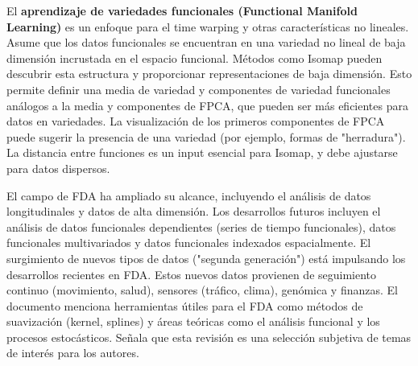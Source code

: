 \documentclass{article}
\begin{document}
\vspace{0.35cm}\noindent
El \textbf{aprendizaje de variedades funcionales (Functional Manifold Learning)} es un enfoque para el time warping y otras características no lineales. Asume que los datos funcionales se encuentran en una variedad no lineal de baja dimensión incrustada en el espacio funcional. Métodos como Isomap pueden descubrir esta estructura y proporcionar representaciones de baja dimensión. Esto permite definir una media de variedad y componentes de variedad funcionales análogos a la media y componentes de FPCA, que pueden ser más eficientes para datos en variedades. La visualización de los primeros componentes de FPCA puede sugerir la presencia de una variedad (por ejemplo, formas de "herradura"). La distancia entre funciones es un input esencial para Isomap, y debe ajustarse para datos dispersos.

\vspace{0.35cm}\noindent
El campo de FDA ha ampliado su alcance, incluyendo el análisis de datos longitudinales y datos de alta dimensión. Los desarrollos futuros incluyen el análisis de datos funcionales dependientes (series de tiempo funcionales), datos funcionales multivariados y datos funcionales indexados espacialmente. El surgimiento de nuevos tipos de datos ("segunda generación") está impulsando los desarrollos recientes en FDA. Estos nuevos datos provienen de seguimiento continuo (movimiento, salud), sensores (tráfico, clima), genómica y finanzas.
El documento menciona herramientas útiles para el FDA como métodos de suavización (kernel, splines) y áreas teóricas como el análisis funcional y los procesos estocásticos. Señala que esta revisión es una selección subjetiva de temas de interés para los autores.
\end{document}
